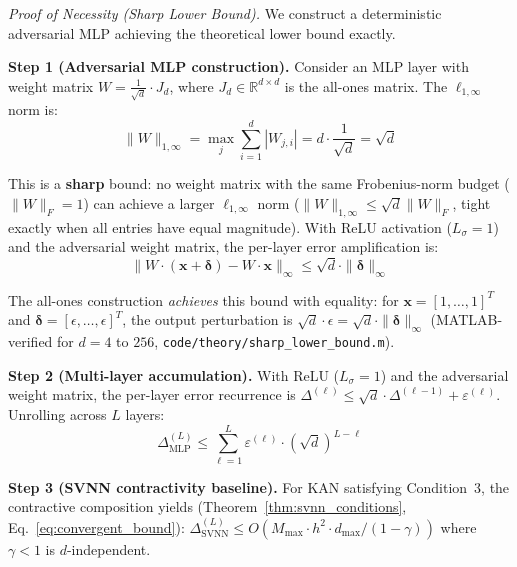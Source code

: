 \vspace{2pt}
\noindent\textit{Proof of Necessity (Sharp Lower Bound).}
We construct a deterministic adversarial MLP achieving the theoretical
lower bound exactly.

\vspace{2pt}
\noindent\textbf{Step 1 (Adversarial MLP construction).}
Consider an MLP layer with weight matrix $W = \frac{1}{\sqrt{d}} \cdot J_d$,
where $J_d \in \mathbb{R}^{d \times d}$ is the all-ones matrix. The
$\ell_{1,\infty}$ norm is:
\begin{equation}
\|W\|_{1,\infty} = \max_{j} \sum_{i=1}^{d} |W_{j,i}|
= d \cdot \frac{1}{\sqrt{d}} = \sqrt{d}
\label{eq:sharp_l1inf}
\end{equation}

This is a \textbf{sharp} bound: no weight matrix with the same
Frobenius-norm budget ($\|W\|_F = 1$) can achieve a larger
$\ell_{1,\infty}$ norm ($\|W\|_{1,\infty} \leq \sqrt{d}\|W\|_F$,
tight exactly when all entries have equal magnitude). With ReLU
activation ($L_\sigma = 1$) and the adversarial weight matrix,
the per-layer error amplification is:
\begin{equation}
\|W \cdot (\mathbf{x} + \boldsymbol{\delta}) - W \cdot \mathbf{x}\|_\infty
\leq \sqrt{d} \cdot \|\boldsymbol{\delta}\|_\infty
\label{eq:sharp_amplification}
\end{equation}

The all-ones construction \textit{achieves} this bound with equality:
for $\mathbf{x} = [1,\ldots,1]^T$ and $\boldsymbol{\delta} =
[\epsilon,\ldots,\epsilon]^T$, the output perturbation is
$\sqrt{d} \cdot \epsilon = \sqrt{d} \cdot \|\boldsymbol{\delta}\|_\infty$
(MATLAB-verified for $d = 4$ to $256$,
\texttt{code/theory/sharp\_lower\_bound.m}).

\vspace{2pt}
\noindent\textbf{Step 2 (Multi-layer accumulation).}
With ReLU ($L_\sigma=1$) and the adversarial weight matrix, the per-layer
error recurrence is $\Delta^{(\ell)} \leq \sqrt{d} \cdot
\Delta^{(\ell-1)} + \varepsilon^{(\ell)}$. Unrolling across $L$ layers:
\begin{equation}
\Delta^{(L)}_{\text{MLP}} \leq \sum_{\ell=1}^{L} \varepsilon^{(\ell)}
\cdot (\sqrt{d})^{L-\ell}
\label{eq:mlp_total_sharp}
\end{equation}

\noindent\textbf{Step 3 (SVNN contractivity baseline).}
For KAN satisfying Condition~3, the contractive composition yields
(Theorem~\ref{thm:svnn_conditions}, Eq.~\ref{eq:convergent_bound}):
$\Delta^{(L)}_{\text{SVNN}} \leq O(M_{\max} \cdot h^2 \cdot d_{\max}
/ (1-\gamma))$ where $\gamma < 1$ is $d$-independent.

